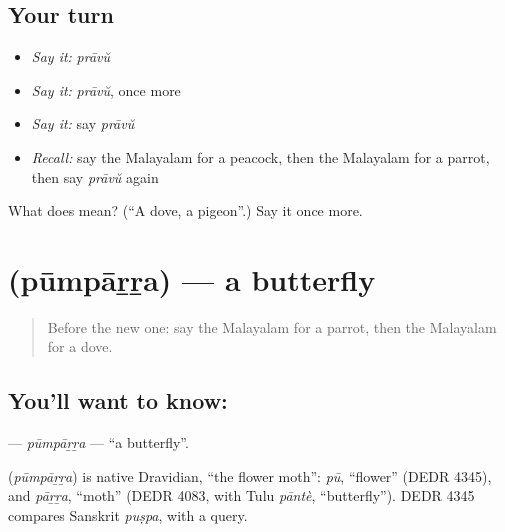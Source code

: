 \subsection*{Your turn}
\begin{itemize}
\raggedright
  \item \emph{Say it:} \emph{prāvŭ}
  \item \emph{Say it:} \emph{prāvŭ}, once more
  \item \emph{Say it:} say \emph{prāvŭ}
  \item \emph{Recall:} say the Malayalam for a peacock, then the Malayalam for a parrot, then say \emph{prāvŭ} again
\end{itemize}

\begin{tcolorbox}[breakable,colback=teal!4,colframe=teal!35!black,title={Before you move on}]
What does  mean? (\textquotedblleft{}A dove, a pigeon\textquotedblright{}.) Say it once more.
\end{tcolorbox}
\section[\texorpdfstring{\ml{പൂമ്പാറ്റ} (pūmpāṟṟa)}{പൂമ്പാറ്റ (pūmpāṟṟa)}]{ (pūmpāṟṟa) — a butterfly}

\label{lesson:ML-C153-pumparra}



\begin{quote}
Before the new one: say the Malayalam for a parrot, then the Malayalam for a dove.
\end{quote}

\subsection*{You'll want to know: }
\textbf{} — \emph{pūmpāṟṟa} — \textquotedblleft{}a butterfly\textquotedblright{}.

\begin{cousinweb}
\textbf{} (\emph{pūmpāṟṟa}) is native Dravidian, \textquotedblleft{}the flower moth\textquotedblright{}: \emph{pū}, \textquotedblleft{}flower\textquotedblright{} (DEDR 4345), and \emph{pāṟṟa}, \textquotedblleft{}moth\textquotedblright{} (DEDR 4083, with Tulu \emph{pāntè}, \textquotedblleft{}butterfly\textquotedblright{}). DEDR 4345 compares Sanskrit \emph{puṣpa}, with a query.
\end{cousinweb}

